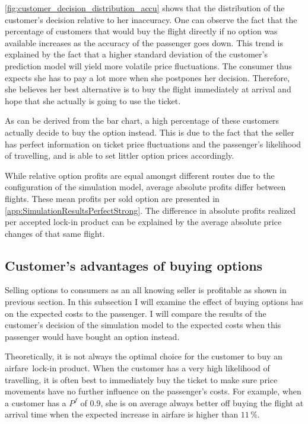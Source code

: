 \autoref{fig:customer_decision_distribution_accu} shows that the distribution of the customer's decision relative to her inaccuracy. One can observe the fact that the percentage of customers that would buy the flight directly if no option was available increases as the accuracy of the passenger goes down. This trend is explained by the fact that a higher standard deviation of the customer's prediction model will yield more volatile price fluctuations. The consumer thus expects she has to pay a lot more when she postpones her decision. Therefore, she believes her best alternative is to buy the flight immediately at arrival and hope that she actually is going to use the ticket.

As can be derived from the bar chart, a high percentage of these customers actually decide to buy the option instead. This is due to the fact that the seller has perfect information on ticket price fluctuations and the passenger's likelihood of travelling, and is able to set littler option prices accordingly.


While relative option profits are equal amongst different routes due to the configuration of the simulation model, average absolute profits differ between flights. These mean profits per sold option are presented in \autoref{app:SimulationResultsPerfectStrong}. The difference in absolute profits realized per accepted lock-in product can be explained by the average absolute price changes of that same flight.


\subsection{Customer's advantages of buying options}
\label{subsec:CustomersAdvantages}
Selling options to consumers as an all knowing seller is profitable as shown in previous section. In this subsection I will examine the effect of buying options has on the expected costs to the passenger. I will compare the results of the customer's decision of the simulation model to the expected costs when this passenger would have bought an option instead.

Theoretically, it is not always the optimal choice for the customer to buy an airfare~lock-in product. When the customer has a very high likelihood of travelling, it is often best to immediately buy the ticket to make sure price movements have no further influence on the passenger's costs. For example, when a customer has a $P^f$ of $0.9$, she is on average always better off buying the flight at arrival time when the expected increase in airfare is higher than $11\,\%$.

